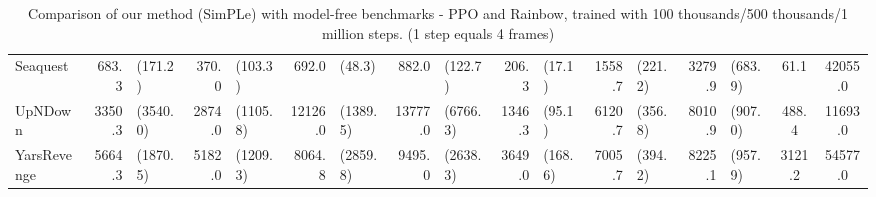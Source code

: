 \begin{landscape}
\begin{changemargin}{0cm}{0cm}
\begin{center}
\begin{table}[!htbp]
\begin{tabular}{lrlrlrlrlrlrlrlcc}
Seaquest       &    683.3 &    (171.2) &    370.0 &   (103.3) &      692.0 &       (48.3) &    882.0 &    (122.7) &    206.3 &   (17.1) &   1558.7 &    (221.2) &    3279.9 &    (683.9) &     61.1 &  42055.0 \\
UpNDown        &   3350.3 &   (3540.0) &   2874.0 &  (1105.8) &    12126.0 &     (1389.5) &  13777.0 &   (6766.3) &   1346.3 &   (95.1) &   6120.7 &    (356.8) &    8010.9 &    (907.0) &    488.4 &  11693.0 \\
YarsRevenge    &   5664.3 &   (1870.5) &   5182.0 &  (1209.3) &     8064.8 &     (2859.8) &   9495.0 &   (2638.3) &   3649.0 &  (168.6) &   7005.7 &    (394.2) &    8225.1 &    (957.9) &   3121.2 &  54577.0 \\

\end{tabular}
\caption{Comparison of our method (SimPLe) with model-free benchmarks - PPO and Rainbow, trained with 100 thousands/500 thousands/1 million steps. (1 step equals 4 frames)}
\label{tab:ppo_rainbow_comparison}
\end{table}
\vspace*{\fill}
\end{center}
\end{changemargin}
\end{landscape}




